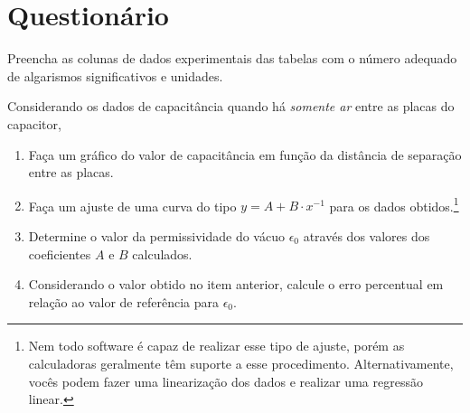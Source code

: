 
\vspace{15mm}

\begin{fullwidth}
\noindent{}
\vspace{5mm}

\noindent{}

\noindent{}

\noindent{}

\noindent{}

\noindent{}
\end{fullwidth}

\vspace{5mm}

\section{Questionário}

\begin{question}[type={exam}]
Preencha as colunas de dados experimentais das tabelas com o número adequado de algarismos significativos e unidades.
\end{question}

\begin{question}[type={exam}]
Considerando os dados de capacitância quando há \emph{somente ar} entre as placas do capacitor,
\begin{enumerate}[label=\roman*.]
    \item Faça um gráfico do valor de capacitância em função da distância de separação entre as placas.
    \item Faça um ajuste de uma curva do tipo $y = A + B \cdot x^{-1}$ para os dados obtidos.\footnote{Nem todo software é capaz de realizar esse tipo de ajuste, porém as calculadoras geralmente têm suporte a esse procedimento. Alternativamente, vocês podem fazer uma linearização dos dados e realizar uma regressão linear.} 
    \item Determine o valor da permissividade do vácuo $\epsilon_0$ através dos valores dos  coeficientes $A$ e $B$ calculados.
    \item Considerando o valor obtido no item anterior, calcule o erro percentual em relação ao valor de referência para $\epsilon_0$.
\end{enumerate}
\end{question}

